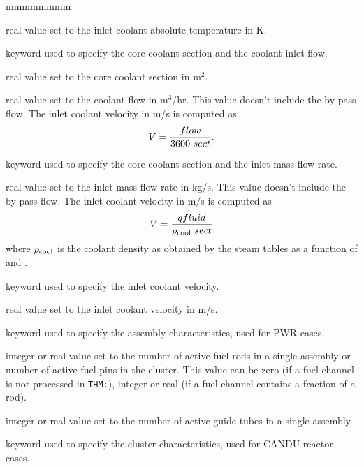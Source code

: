 \begin{ListeDeDescription}{mmmmmmmm}
\item[\dusa{tinlet}] real value set to the inlet coolant absolute temperature in K.

\item[\moc{CWSECT}] keyword used to specify the core coolant section and the coolant inlet flow.

\item[\dusa{sect}] real value set to the core coolant section in m$^2$.

\item[\dusa{flow}] real value set to the coolant flow in m$^3$/hr. This value doesn't include the by-pass flow.
The inlet coolant velocity in m/s is computed as $$V={{\sl flow} \over 3600 \ {\sl sect}}.$$

\item[\moc{INLET-Q}] keyword used to specify the core coolant section and the inlet mass flow rate.

\item[\dusa{qfluid}] real value set to the inlet mass flow rate in kg/s. This value doesn't include the by-pass flow.
The inlet coolant velocity in m/s is computed as $$V={{\sl qfluid} \over \rho_{\rm cool} \ {\sl sect}}$$
\noindent where $\rho_{\rm cool}$ is the coolant density as obtained by the steam tables as a function of  and .

\item[\moc{SPEED}] keyword used to specify the inlet coolant velocity.

\item[\dusa{velocity}] real value set to the inlet coolant velocity in m/s.

\item[\moc{ASSMB}] keyword used to specify the assembly characteristics, used for PWR cases.

\item[\dusa{nbf}] integer or real value set to the number of active fuel rods in a single assembly or number of active fuel pins in the cluster. This value
can be zero (if a fuel channel is not processed in {\tt THM:}), integer or real (if a fuel channel contains a fraction of a rod).

\item[\dusa{nbg}] integer or real value set to the number of active guide tubes in a single assembly.

\item[\moc{CLUSTER}] keyword used to specify the cluster characteristics, used for CANDU reactor cases.


\end{ListeDeDescription}
